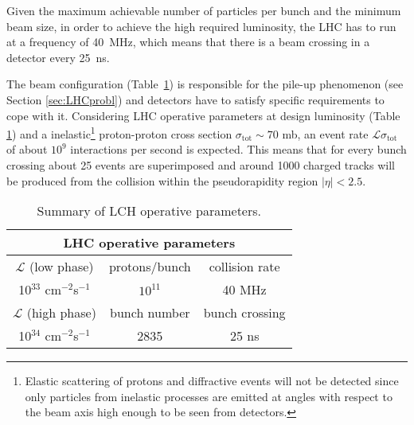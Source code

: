 Given the maximum achievable number of particles per bunch 
and the minimum beam size, 
in order to achieve the high required luminosity, the LHC  has
to run at a frequency of 40~MHz, which means that there is a beam crossing
in a detector every 25~ns.\par
The beam configuration (Table~\ref{tab:LHCpar}) is responsible for the pile-up phenomenon (see Section \ref{sec:LHCprobl}) and detectors have to satisfy specific requirements to cope with it. Considering LHC operative parameters at design luminosity (Table \ref{tab:LHCpar}) and a inelastic\footnote{Elastic scattering of protons and diffractive events will not be detected since only particles from inelastic processes are emitted at angles with respect to the beam axis high enough to be seen from detectors.} proton-proton cross section $\sigma_{\mbox{tot}} \sim 70$ mb, an event rate  $\mathcal L\sigma_{\mbox{tot}}$ of about $10^{9}$ interactions per second is expected. This means that for every bunch crossing about 25 events are superimposed and around 1000 charged tracks will be produced from the collision within the pseudorapidity region $|\eta| < 2.5$.

\begin{table}[htb]\centering\begin{tabular}{ccc}
\multicolumn{3}{c}{LHC operative parameters}\\ \midrule
$\mathcal L$ (low phase) & protons/bunch & collision rate\\ 
10$^{33}$ cm$^{-2}$s$^{-1}$ & $10^{11}$& 40 MHz \\\midrule
$\mathcal L$ (high phase) & bunch number & bunch crossing \\ 
10$^{34}$ cm$^{-2}$s$^{-1}$ & 2835 & 25 ns \\\hline\hline\end{tabular}\caption{Summary of LCH operative parameters.}\label{tab:LHCpar}\end{table}




